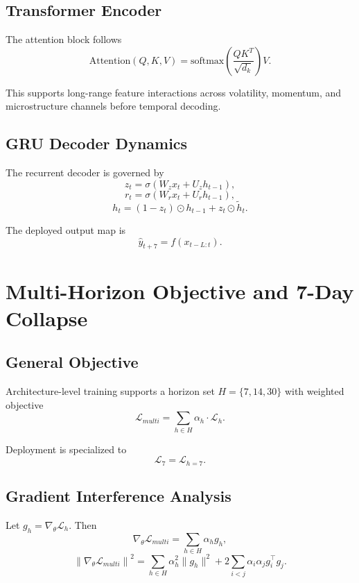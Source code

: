 \documentclass{article}
\begin{document}
\subsection{Transformer Encoder}
The attention block follows
\begin{equation}
\text{Attention}(Q,K,V)=\text{softmax}\left(\frac{QK^T}{\sqrt{d_k}}\right)V.
\end{equation}

This supports long-range feature interactions across volatility, momentum, and microstructure channels before temporal decoding.

\subsection{GRU Decoder Dynamics}
The recurrent decoder is governed by
\begin{equation}
z_t = \sigma(W_z x_t + U_z h_{t-1}),
\end{equation}
\begin{equation}
r_t = \sigma(W_r x_t + U_r h_{t-1}),
\end{equation}
\begin{equation}
h_t = (1 - z_t) \odot h_{t-1} + z_t \odot \tilde{h}_t.
\end{equation}

The deployed output map is
\begin{equation}
\hat{y}_{t+7}=f(x_{t-L:t}).
\end{equation}

\section{Multi-Horizon Objective and 7-Day Collapse}
\subsection{General Objective}
Architecture-level training supports a horizon set $H=\{7,14,30\}$ with weighted objective
\begin{equation}
\mathcal{L}_{multi} = \sum_{h \in H} \alpha_h \cdot \mathcal{L}_h.
\end{equation}

Deployment is specialized to
\begin{equation}
\mathcal{L}_{7} = \mathcal{L}_{h=7}.
\end{equation}

\subsection{Gradient Interference Analysis}
Let $g_h=\nabla_\theta \mathcal{L}_h$. Then
\begin{equation}
\nabla_\theta \mathcal{L}_{multi}=\sum_{h \in H} \alpha_h g_h,
\end{equation}
\begin{equation}
\left\|\nabla_\theta \mathcal{L}_{multi}\right\|^2=
\sum_{h \in H}\alpha_h^2\|g_h\|^2 + 2\sum_{i<j}\alpha_i\alpha_j g_i^\top g_j.
\end{equation}
\end{document}
